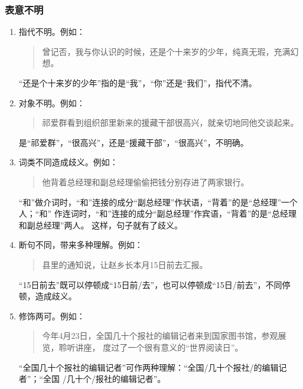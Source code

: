 \documentclass[final,oneside]{ctexbook}
\newenvironment{equotation}{\begin{quotation}\kaishu}{\end{quotation}}
\begin{document}
\subsubsection{表意不明}

\begin{enumerate}
  \item 指代不明。例如：

    \begin{equotation}
      曾记否，我与你认识的时候，还是个十来岁的少年，纯真无瑕，充满幻想。
    \end{equotation}

    “还是个十来岁的少年”指的是“我”，“你”还是“我们”，指代不清。

  \item 对象不明。例如：

    \begin{equotation}
      祁爱群看到组织部里新来的援藏干部很高兴，就亲切地同他交谈起来。
    \end{equotation}

    是“祁爱群”，“很高兴”，还是“援藏干部”，“很高兴”，不明确。

  \item 词类不同造成歧义。例如：

    \begin{equotation}
      他背着总经理和副总经理偷偷把钱分别存进了两家银行。
    \end{equotation}

    “和”做介词时，“和”连接的成分“副总经理”作状语，“背着”的是“总经理”一个人；“和”
    作连词时，“和”连接的成分“副总经理”作宾语，“背着”的是“总经理和副总经理”两人。
    这样，句子就有了歧义。

  \item 断句不同，带来多种理解。例如：

    \begin{equotation}
      县里的通知说，让赵乡长本月15日前去汇报。
    \end{equotation}

    “15日前去”既可以停顿成“15日前/去”，也可以停顿成“15日/前去”，不同停顿，造成歧义。

  \item 修饰两可。例如：

    \begin{equotation}
      今年4月23日，全国几十个报社的编辑记者来到国家图书馆，参观展览，聆听讲座，
      度过了一个很有意义的“世界阅读日”。
    \end{equotation}

    “全国几十个报社的编辑记者”可作两种理解：“全国/几十个报社/的编辑记者”；“全国
    /几十个/报社的编辑记者”。

\end{enumerate}
\end{document}
